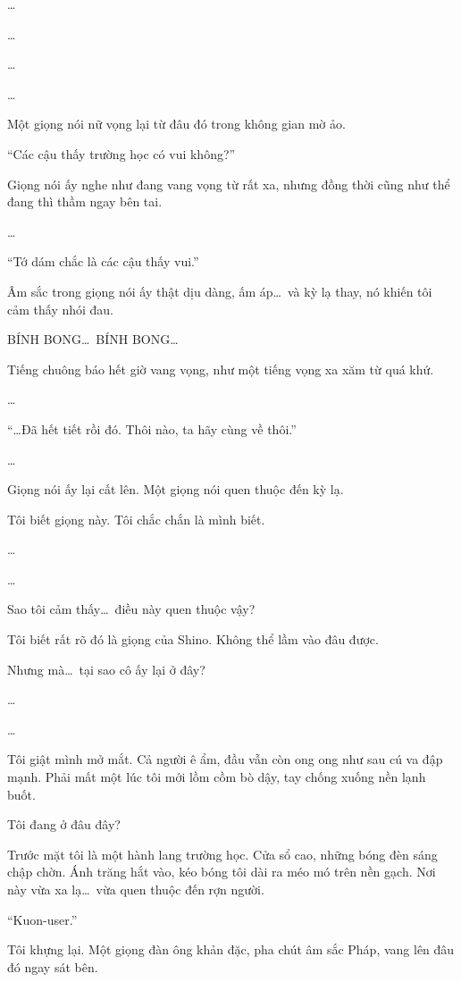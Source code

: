 \documentclass[../main.tex]{subfiles}
\begin{document}
\dots

\dots

\ct


\dots

\dots

Một giọng nói nữ vọng lại từ đâu đó trong không gian mờ ảo.

``Các cậu thấy trường học có vui không?''

Giọng nói ấy nghe như đang vang vọng từ rất xa, nhưng đồng thời cũng như thể đang thì thầm ngay bên tai.

\dots

``Tớ dám chắc là các cậu thấy vui.''

Âm sắc trong giọng nói ấy thật dịu dàng, ấm áp\dots\ và kỳ lạ thay, nó khiến tôi cảm thấy nhói đau.

BÍNH BONG\dots\ BÍNH BONG\dots

Tiếng chuông báo hết giờ vang vọng, như một tiếng vọng xa xăm từ quá khứ.

\dots

``\dots Đã hết tiết rồi đó. Thôi nào, ta hãy cùng về thôi.''

\dots

Giọng nói ấy lại cất lên. Một giọng nói quen thuộc đến kỳ lạ.

Tôi biết giọng này. Tôi chắc chắn là mình biết.

\dots

\dots

Sao tôi cảm thấy\dots\ điều này quen thuộc vậy?

Tôi biết rất rõ đó là giọng của Shino. Không thể lầm vào đâu được.

Nhưng mà\dots\ tại sao cô ấy lại ở đây?

\dots

\dots

Tôi giật mình mở mắt. Cả người ê ẩm, đầu vẫn còn ong ong như sau cú va đập mạnh. Phải mất một lúc tôi mới lồm cồm bò dậy, tay chống xuống nền lạnh buốt.

Tôi đang ở đâu đây?

Trước mặt tôi là một hành lang trường học. Cửa sổ cao, những bóng đèn sáng chập chờn. Ánh trăng hắt vào, kéo bóng tôi dài ra méo mó trên nền gạch. Nơi này vừa xa lạ\dots\ vừa quen thuộc đến rợn người.

``Kuon-user.''

Tôi khựng lại. Một giọng đàn ông khản đặc, pha chút âm sắc Pháp, vang lên đâu đó ngay sát bên.
\end{document}
